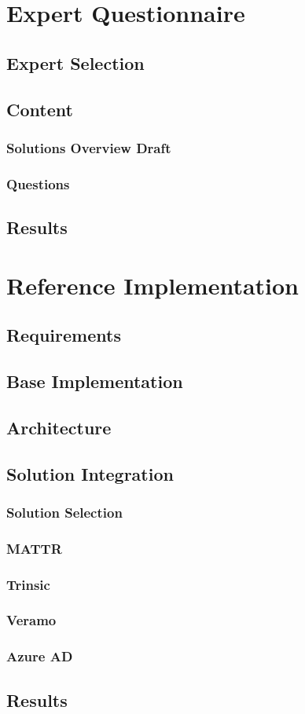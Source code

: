 
\chapter{Expert Questionnaire}\label{chapter: expert}

	\section{Expert Selection}
	
	\section{Content}
	\subsection{Solutions Overview Draft}
	\subsection{Questions}

	\section{Results}
	
	
\chapter{Reference Implementation}\label{chapter: implementation}

    \section{Requirements}
    \section{Base Implementation}
    \section{Architecture}
    \section{Solution Integration}
    \subsection{Solution Selection}
    \subsection{MATTR}
    \subsection{Trinsic}
    \subsection{Veramo}
    \subsection{Azure AD}
    \section{Results}